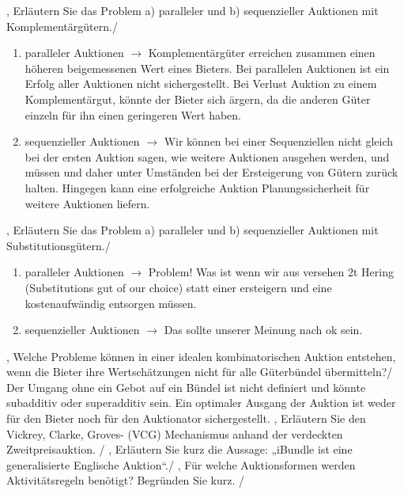 \documentclass[11pt]{article}
\begin{document}
{{\begin{enumerate}
        \end{enumerate}
    },
    {Erläutern Sie das Problem a) paralleler und b) sequenzieller Auktionen mit Komplementärgütern.}/
    {
        \begin{enumerate}
            \item paralleler Auktionen $\to$ Komplementärgüter erreichen zusammen einen höheren beigemessenen Wert eines Bieters. Bei parallelen Auktionen ist ein Erfolg aller Auktionen nicht sichergestellt. Bei Verlust Auktion zu einem Komplementärgut, könnte der Bieter sich ärgern, da die anderen Güter einzeln für ihn einen geringeren Wert haben.
            \item sequenzieller Auktionen $\to$ Wir können bei einer Sequenziellen nicht gleich bei der ersten Auktion sagen, wie weitere Auktionen ausgehen werden, und müssen und daher unter Umständen bei der Ersteigerung von Gütern zurück halten. Hingegen kann eine erfolgreiche Auktion Planungssicherheit für weitere Auktionen liefern.
        \end{enumerate}
    },
    {Erläutern Sie das Problem a) paralleler und b) sequenzieller Auktionen mit Substitutionsgütern.}/
    {
        \begin{enumerate}
            \item paralleler Auktionen $\to$ Problem! Was ist wenn wir aus versehen 2t Hering (Substitutions gut of our choice) statt einer ersteigern und eine kostenaufwändig entsorgen müssen.
            \item sequenzieller Auktionen $\to$ Das sollte unserer Meinung nach ok sein.
        \end{enumerate}
    },
    {Welche Probleme können in einer idealen kombinatorischen Auktion entstehen, wenn die Bieter ihre Wertschätzungen nicht für alle Güterbündel übermitteln?}/
    {
        Der Umgang ohne ein Gebot auf ein Bündel ist nicht definiert und könnte subadditiv oder superadditiv sein. Ein optimaler Ausgang der Auktion ist weder für den Bieter noch für den Auktionator sichergestellt.
    },
    {Erläutern Sie den Vickrey, Clarke, Groves- (VCG) Mechanismus anhand der verdeckten Zweitpreisauktion.}
    /
    {
        \todo
    },
    {Erläutern Sie kurz die Aussage: „iBundle ist eine generalisierte Englische Auktion“.}/
    {
        \todo
    },
    {Für welche Auktionsformen werden Aktivitätsregeln benötigt? Begründen Sie kurz.}
    /
    {
        \todo
    }
}


\end{document}
